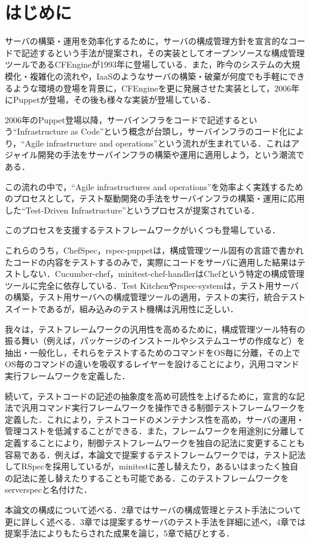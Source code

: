 \section{はじめに}

サーバの構築・運用を効率化するために，サーバの構成管理方針を宣言的なコードで記述するという手法が提案され，その実装としてオープンソースな構成管理ツールであるCFEngine\cite{cfengine}が1993年に登場している．また，昨今のシステムの大規模化・複雑化の流れや，IaaSのようなサーバの構築・破棄が何度でも手軽にできるような環境の登場を背景に，CFEngineを更に発展させた実装として，2006年にPuppet\cite{puppet}が登場，その後も様々な実装が登場している\cite{chef}\cite{saltstack}\cite{ansible}．

2006年のPuppet登場以降，サーバインフラをコードで記述するという``Infrastructure as Code''という概念が台頭し，サーバインフラのコード化により，``Agile infrastructure and operations''\cite{agile infrastructure}という流れが生まれている．これはアジャイル開発の手法をサーバインフラの構築や運用に適用しよう，という潮流である．

この流れの中で，``Agile infrastructures and operations''を効率よく実践するためのプロセスとして，テスト駆動開発の手法をサーバインフラの構築・運用に応用した``Test-Driven Infrastructure''\cite{test driven infrastructure with chef}というプロセスが提案されている．

このプロセスを支援するテストフレームワークがいくつも登場している\cite{chefspec}\cite{rspec-puppet}\cite{cucumber-chef}\cite{minitest-chef-handler}\cite{test kitchen}\cite{rspec-system}．

これらのうち，ChefSpec，rspec-puppetは，構成管理ツール固有の言語で書かれたコードの内容をテストするのみで，実際にコードをサーバに適用した結果はテストしない．Cucumber-chef，minitest-chef-handlerはChefという特定の構成管理ツールに完全に依存している．Test Kitchenやrspec-systemは，テスト用サーバの構築，テスト用サーバへの構成管理ツールの適用，テストの実行，統合テストスイートであるが，組み込みのテスト機構は汎用性に乏しい．

我々は，テストフレームワークの汎用性を高めるために，構成管理ツール特有の振る舞い（例えば，パッケージのインストールやシステムユーザの作成など）を抽出・一般化し，それらをテストするためのコマンドをOS毎に分離，その上でOS毎のコマンドの違いを吸収するレイヤーを設けることにより，汎用コマンド実行フレームワークを定義した．

続いて，テストコードの記述の抽象度を高め可読性を上げるために，宣言的な記法で汎用コマンド実行フレームワークを操作できる制御テストフレームワークを定義した．これにより，テストコードのメンテナンス性を高め，サーバの運用・管理コストを低減することができる．また，フレームワークを用途別に分離して定義することにより，制御テストフレームワークを独自の記法に変更することも容易である．例えば，本論文で提案するテストフレームワークでは，テスト記法してRSpec\cite{rspec}を採用しているが，minitest\cite{minitest}に差し替えたり，あるいはまったく独自の記法に差し替えたりすることも可能である．このテストフレームワークをserverspec\cite{serverspec}と名付けた．

本論文の構成について述べる．2章ではサーバの構成管理とテスト手法について更に詳しく述べる．3章では提案するサーバのテスト手法を詳細に述べ，4章では提案手法によりもたらされた成果を論じ，5章で結びとする．

